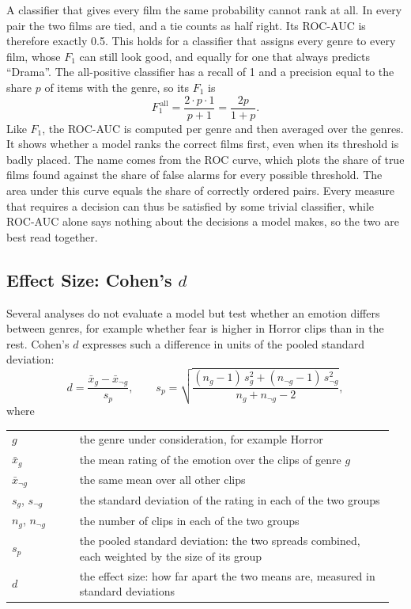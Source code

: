 A classifier that gives every film the same probability cannot rank at all. In every pair the two films are tied, and a tie counts as half right. Its ROC-AUC is therefore exactly 0.5. This holds for a classifier that assigns every genre to every film, whose $F_1$ can still look good, and equally for one that always predicts ``Drama''. The all-positive classifier has a recall of 1 and a precision equal to the share $p$ of items with the genre, so its $F_1$ is
\begin{equation}
  F_1^{\,\text{all}} = \frac{2 \cdot p \cdot 1}{p + 1} = \frac{2p}{1+p}.
\end{equation} Like $F_1$, the ROC-AUC is computed per genre and then averaged over the genres. It shows whether a model ranks the correct films first, even when its threshold is badly placed. The name comes from the ROC curve, which plots the share of true films found against the share of false alarms for every possible threshold. The area under this curve equals the share of correctly ordered pairs. Every measure that requires a decision can thus be satisfied by some trivial classifier, while ROC-AUC alone says nothing about the decisions a model makes, so the two are best read together.

\subsection{Effect Size: Cohen's $d$}

Several analyses do not evaluate a model but test whether an emotion differs between genres, for example whether fear is higher in Horror clips than in the rest. Cohen's $d$ expresses such a difference in units of the pooled standard deviation:
\begin{equation}
  d = \frac{\bar{x}_{g} - \bar{x}_{\neg g}}{s_p}, \qquad
  s_p = \sqrt{\frac{(n_{g}-1)\,s_{g}^2 + (n_{\neg g}-1)\,s_{\neg g}^2}{n_{g} + n_{\neg g} - 2}},
\end{equation}
where

\smallskip
\noindent\begin{tabular}{@{}p{0.17\linewidth}p{0.79\linewidth}@{}}
  $g$ & the genre under consideration, for example Horror \\
  $\bar{x}_{g}$ & the mean rating of the emotion over the clips of genre $g$ \\
  $\bar{x}_{\neg g}$ & the same mean over all other clips \\
  $s_{g}$, $s_{\neg g}$ & the standard deviation of the rating in each of the two groups \\
  $n_{g}$, $n_{\neg g}$ & the number of clips in each of the two groups \\
  $s_p$ & the pooled standard deviation: the two spreads combined, each weighted by the size of its group \\
  $d$ & the effect size: how far apart the two means are, measured in standard deviations \\
\end{tabular}
\smallskip

